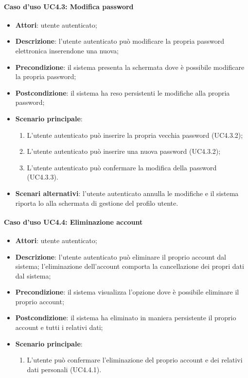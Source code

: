 \paragraph{Caso d'uso UC4.3: Modifica password}

\begin{itemize}
	\item \textbf{Attori}: utente autenticato;
	\item \textbf{Descrizione}: l'utente autenticato può modificare la propria password elettronica inserendone una nuova;
	\item \textbf{Precondizione}: il sistema presenta la schermata dove è possibile modificare la propria password;
	\item \textbf{Postcondizione}: il sistema ha reso persistenti le modifiche alla propria password;
	\item \textbf{Scenario principale}:
	\begin{enumerate}
		\item L'utente autenticato può inserire la propria vecchia password (UC4.3.2);
		\item L'utente autenticato può inserire una nuova password (UC4.3.2);
		\item L'utente autenticato può confermare la modifica della password (UC4.3.3).
	\end{enumerate}
	\item \textbf{Scenari alternativi}: l'utente autenticato annulla le modifiche e il sistema riporta lo alla schermata di gestione del profilo utente.
\end{itemize}

\paragraph{Caso d'uso UC4.4: Eliminazione account}

\begin{itemize}
	\item \textbf{Attori}: utente autenticato;
	\item \textbf{Descrizione}: l'utente autenticato può eliminare il proprio account dal sistema; l'eliminazione dell'account comporta la cancellazione dei propri dati dal sistema; 
	\item \textbf{Precondizione}: il sistema visualizza l'opzione dove è possibile eliminare il proprio account;
	\item \textbf{Postcondizione}: il sistema ha eliminato in maniera persistente il proprio account e tutti i relativi dati;
	\item \textbf{Scenario principale}:
		\begin{enumerate}
			\item L'utente può confermare l'eliminazione del proprio account e dei relativi dati personali (UC4.4.1).
		\end{enumerate}
\end{itemize}


